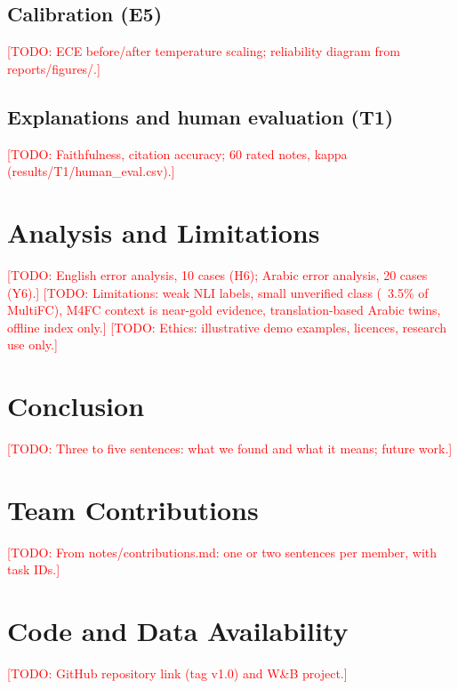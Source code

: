 \documentclass[11pt,a4paper]{article}
\newcommand{\todo}[1]{\textcolor{red}{[TODO: #1]}}
\begin{document}
\subsection{Calibration (E5)}
\todo{ECE before/after temperature scaling; reliability diagram from reports/figures/.}
\subsection{Explanations and human evaluation (T1)}
\todo{Faithfulness, citation accuracy; 60 rated notes, kappa (results/T1/human\_eval.csv).}

\section{Analysis and Limitations}
\label{sec:analysis}
\todo{English error analysis, 10 cases (H6); Arabic error analysis, 20 cases (Y6).}
\todo{Limitations: weak NLI labels, small unverified class (~3.5\% of MultiFC),
M4FC context is near-gold evidence, translation-based Arabic twins, offline index only.}
\todo{Ethics: illustrative demo examples, licences, research use only.}

\section{Conclusion}
\label{sec:conclusion}
\todo{Three to five sentences: what we found and what it means; future work.}

\section*{Team Contributions}
\todo{From notes/contributions.md: one or two sentences per member, with task IDs.}

\section*{Code and Data Availability}
\todo{GitHub repository link (tag v1.0) and W\&B project.}



\end{document}
